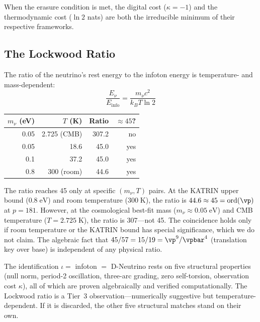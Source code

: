 When the erasure condition is met, the digital cost ($\kappa = -1$) and the thermodynamic cost ($\ln 2$ nats) are both the irreducible minimum of their respective frameworks.

\subsection{The Lockwood Ratio}

The ratio of the neutrino's rest energy to the infoton energy is temperature- and mass-dependent:
\[
\frac{E_\nu}{E_{\mathrm{info}}} = \frac{m_\nu c^2}{k_B T \ln 2}
\]

\begin{center}
\begin{tabular}{@{}rrrr@{}}
\toprule
$m_\nu$ (eV) & $T$ (K) & Ratio & $\approx 45$? \\
\midrule
0.05 & 2.725 (CMB) & 307.2 & no \\
0.05 & 18.6 & 45.0 & yes \\
0.1 & 37.2 & 45.0 & yes \\
0.8 & 300 (room) & 44.6 & yes \\
\bottomrule
\end{tabular}
\end{center}

The ratio reaches 45 only at specific $(m_\nu, T)$ pairs. At the KATRIN upper bound ($0.8\;\mathrm{eV}$) and room temperature ($300\;\mathrm{K}$), the ratio is $44.6 \approx 45 = \mathrm{ord}(\vp)$ at $p = 181$. However, at the cosmological best-fit mass ($m_\nu \approx 0.05\;\mathrm{eV}$) and CMB temperature ($T = 2.725\;\mathrm{K}$), the ratio is 307---not 45. The coincidence holds only if room temperature or the KATRIN bound has special significance, which we do not claim. The algebraic fact that $45/57 = 15/19 = \vp^9/\vpbar^4$ (translation key over base) is independent of any physical ratio.

\begin{remark}
The identification $\iota = $ infoton $=$ D-Neutrino rests on five structural properties (null norm, period-2 oscillation, three-arc grading, zero self-torsion, observation cost $\kappa$), all of which are proven algebraically and verified computationally. The Lockwood ratio is a Tier~3 observation---numerically suggestive but temperature-dependent. If it is discarded, the other five structural matches stand on their own.
\end{remark}

